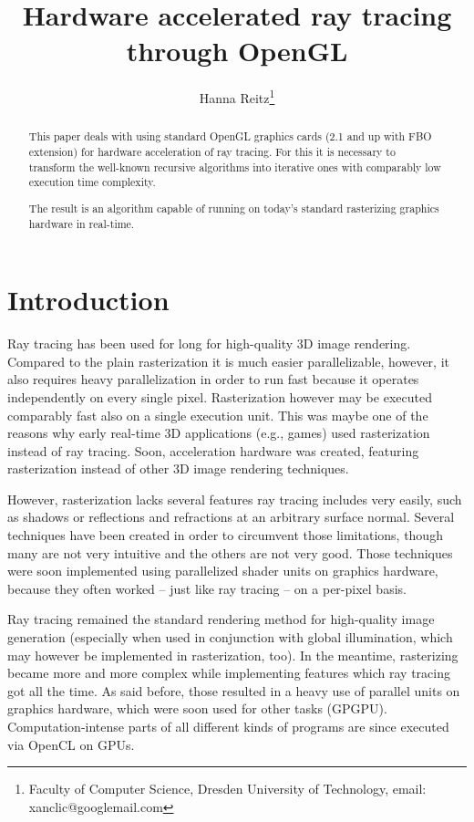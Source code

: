\documentclass[english,fleqn,10pt,twocolumn]{article}
\date{}
\title{Hardware accelerated ray tracing through OpenGL}
\author{Hanna Reitz\thanks{Faculty of Computer Science, Dresden University of Technology, email: xanclic@googlemail.com}}
\begin{document}
\maketitle

\begin{abstract}
    This paper deals with using standard OpenGL graphics cards (2.1 and up with FBO extension) for hardware acceleration of ray tracing. For this it is necessary to transform the well-known recursive algorithms into iterative ones with
    comparably low execution time complexity. \par
    The result is an algorithm capable of running on today's standard rasterizing graphics hardware in real-time.
\end{abstract}


\section{Introduction}

Ray tracing has been used for long for high-quality 3D image rendering. Compared to the plain rasterization it is much easier parallelizable, however, it also requires heavy parallelization in order to run fast because it operates
independently on every single pixel. Rasterization however may be executed comparably fast also on a single execution unit. This was maybe one of the reasons why early real-time 3D applications (e.g., games) used rasterization instead
of ray tracing. Soon, acceleration hardware was created, featuring rasterization instead of other 3D image rendering techniques.

However, rasterization lacks several features ray tracing includes very easily, such as shadows or reflections and refractions at an arbitrary surface normal. Several techniques have been created in order to circumvent those limitations,
though many are not very intuitive and the others are not very good. Those techniques were soon implemented using parallelized shader units on graphics hardware, because they often worked -- just like ray tracing -- on a per-pixel basis.

Ray tracing remained the standard rendering method for high-quality image generation (especially when used in conjunction with global illumination, which may however be implemented in rasterization, too). In the meantime, rasterizing
became more and more complex while implementing features which ray tracing got all the time. As said before, those resulted in a heavy use of parallel units on graphics hardware, which were soon used for other tasks (GPGPU).
Computation-intense parts of all different kinds of programs are since executed via OpenCL on GPUs.
\end{document}
